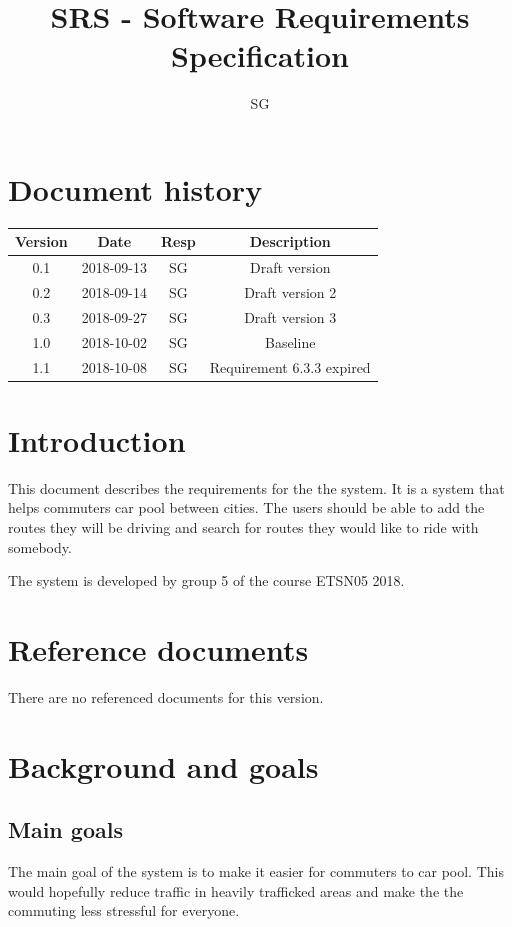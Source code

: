 \documentclass{article}
\title{SRS - Software Requirements Specification}
\begin{document}
\author{SG}

\maketitle
\thispagestyle{fancy}
\tableofcontents
\newpage

\section*{Document history}
 \begin{tabular}{||c c c c||} 
 \hline
 Version & Date & Resp & Description \\ [0.5ex] 
 \hline\hline
 0.1 & 2018-09-13 & SG & Draft version \\ 
 0.2 & 2018-09-14 & SG & Draft version 2 \\
 0.3 & 2018-09-27 & SG & Draft version 3 \\
 1.0 & 2018-10-02 & SG & Baseline \\
 1.1 & 2018-10-08 & SG & Requirement 6.3.3 expired \\
 \hline
 

\end{tabular}

\section{Introduction}
This document describes the requirements for the the system. It is a system that helps commuters car pool between cities. The users should be able to add the routes they will be driving and search for routes they would like to ride with somebody.

The system is developed by group 5 of the course ETSN05 2018.

\section{Reference documents}
There are no referenced documents for this version.
\section{Background and goals}

\subsection{Main goals}
The main goal of the system is to make it easier for commuters to car pool. This would hopefully reduce traffic in heavily trafficked areas and make the the commuting less stressful for everyone.  
\end{document}
